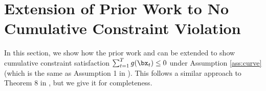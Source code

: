 \onecolumn


\appendix

\section{Extension of Prior Work to No Cumulative Constraint Violation}
\label{apx:ext}

In this section, we show how the prior work \citet{yu2017online} and \citet{yuan2018online} can be extended to show cumulative constraint satisfaction $\sum_{t=1}^{T} g(\bx_t) \leq 0$ under Assumption \ref{ass:curve} (which is the same as Assumption 1 in \citet{mahdavi2012trading}).
This follows a similar approach to Theorem 8 in \cite{mahdavi2012trading}, but we give it for completeness.

